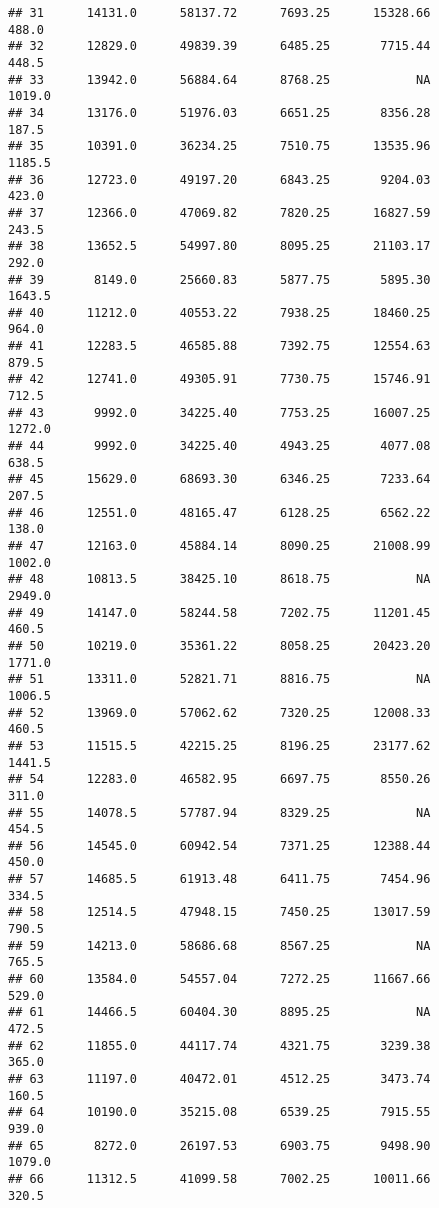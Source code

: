 \documentclass[]{article}
\begin{document}
\begin{verbatim}
## 31      14131.0      58137.72      7693.25      15328.66         488.0
## 32      12829.0      49839.39      6485.25       7715.44         448.5
## 33      13942.0      56884.64      8768.25            NA        1019.0
## 34      13176.0      51976.03      6651.25       8356.28         187.5
## 35      10391.0      36234.25      7510.75      13535.96        1185.5
## 36      12723.0      49197.20      6843.25       9204.03         423.0
## 37      12366.0      47069.82      7820.25      16827.59         243.5
## 38      13652.5      54997.80      8095.25      21103.17         292.0
## 39       8149.0      25660.83      5877.75       5895.30        1643.5
## 40      11212.0      40553.22      7938.25      18460.25         964.0
## 41      12283.5      46585.88      7392.75      12554.63         879.5
## 42      12741.0      49305.91      7730.75      15746.91         712.5
## 43       9992.0      34225.40      7753.25      16007.25        1272.0
## 44       9992.0      34225.40      4943.25       4077.08         638.5
## 45      15629.0      68693.30      6346.25       7233.64         207.5
## 46      12551.0      48165.47      6128.25       6562.22         138.0
## 47      12163.0      45884.14      8090.25      21008.99        1002.0
## 48      10813.5      38425.10      8618.75            NA        2949.0
## 49      14147.0      58244.58      7202.75      11201.45         460.5
## 50      10219.0      35361.22      8058.25      20423.20        1771.0
## 51      13311.0      52821.71      8816.75            NA        1006.5
## 52      13969.0      57062.62      7320.25      12008.33         460.5
## 53      11515.5      42215.25      8196.25      23177.62        1441.5
## 54      12283.0      46582.95      6697.75       8550.26         311.0
## 55      14078.5      57787.94      8329.25            NA         454.5
## 56      14545.0      60942.54      7371.25      12388.44         450.0
## 57      14685.5      61913.48      6411.75       7454.96         334.5
## 58      12514.5      47948.15      7450.25      13017.59         790.5
## 59      14213.0      58686.68      8567.25            NA         765.5
## 60      13584.0      54557.04      7272.25      11667.66         529.0
## 61      14466.5      60404.30      8895.25            NA         472.5
## 62      11855.0      44117.74      4321.75       3239.38         365.0
## 63      11197.0      40472.01      4512.25       3473.74         160.5
## 64      10190.0      35215.08      6539.25       7915.55         939.0
## 65       8272.0      26197.53      6903.75       9498.90        1079.0
## 66      11312.5      41099.58      7002.25      10011.66         320.5

\end{verbatim}
\end{document}
